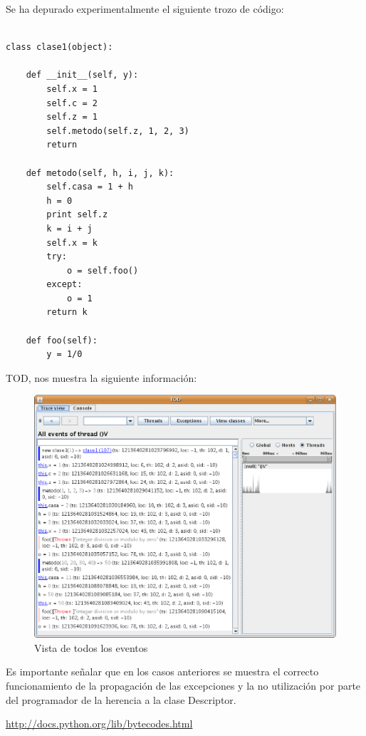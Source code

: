 \documentclass[10pt,a4paper]{article}
\begin{document}
Se ha depurado experimentalmente el siguiente trozo de código:\\

\begin{verbatim}
    
class clase1(object):
    
    def __init__(self, y):
        self.x = 1
        self.c = 2
        self.z = 1
        self.metodo(self.z, 1, 2, 3)
        return
    
    def metodo(self, h, i, j, k):
        self.casa = 1 + h
        h = 0
        print self.z
        k = i + j
        self.x = k
        try:
            o = self.foo()
        except:
            o = 1
        return k
    
    def foo(self):
        y = 1/0
\end{verbatim}


TOD, nos muestra la siguiente información:\\
\newpage
\begin{figure}[hpb]
	\centering
	\includegraphics[scale=0.3]{images/TOD-2.eps}
	\caption{Vista de todos los eventos}
\end{figure}

Es importante señalar que en los casos anteriores se muestra el correcto funcionamiento de la propagación de las excepciones y la no utilización por parte del programador de la herencia a la clase Descriptor.

\newpage
\begin{thebibliography}{2}
 \url{http://docs.python.org/lib/bytecodes.html}
\end{thebibliography}
\end{document}
